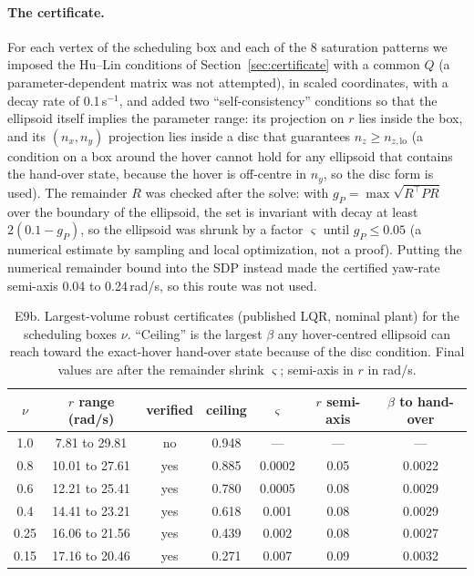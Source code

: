 \paragraph{The certificate.} For each vertex of the scheduling box and each of the 8 saturation patterns we imposed the Hu--Lin conditions of Section~\ref{sec:certificate} with a common $Q$ (a parameter-dependent matrix was not attempted), in scaled coordinates, with a decay rate of 0.1\,s$^{-1}$, and added two ``self-consistency'' conditions so that the ellipsoid itself implies the parameter range: its projection on $r$ lies inside the box, and its $(n_x,n_y)$ projection lies inside a disc that guarantees $n_z\ge n_{z,\mathrm{lo}}$ (a condition on a box around the hover cannot hold for any ellipsoid that contains the hand-over state, because the hover is off-centre in $n_y$, so the disc form is used). The remainder $R$ was checked after the solve: with $g_P=\max\sqrt{R^\top P R}$ over the boundary of the ellipsoid, the set is invariant with decay at least $2(0.1-g_P)$, so the ellipsoid was shrunk by a factor $\varsigma$ until $g_P\le0.05$ (a numerical estimate by sampling and local optimization, not a proof). Putting the numerical remainder bound into the SDP instead made the certified yaw-rate semi-axis 0.04 to 0.24\,rad/s, so this route was not used.

\begin{table}[h]
\centering\small
\caption{E9b. Largest-volume robust certificates (published LQR, nominal plant) for the scheduling boxes $\nu$. ``Ceiling'' is the largest $\beta$ any hover-centred ellipsoid can reach toward the exact-hover hand-over state because of the disc condition. Final values are after the remainder shrink $\varsigma$; semi-axis in $r$ in rad/s.}\label{tab:e9b}
\begin{tabular}{ccccccc}
\toprule
$\nu$ & $r$ range (rad/s) & verified & ceiling & $\varsigma$ & $r$ semi-axis & $\beta$ to hand-over \\
\midrule
1.0  & 7.81 to 29.81 & no & 0.948 & --- & --- & --- \\
0.8  & 10.01 to 27.61 & yes & 0.885 & 0.0002 & 0.05 & 0.0022 \\
0.6  & 12.21 to 25.41 & yes & 0.780 & 0.0005 & 0.08 & 0.0029 \\
0.4  & 14.41 to 23.21 & yes & 0.618 & 0.001 & 0.08 & 0.0029 \\
0.25 & 16.06 to 21.56 & yes & 0.439 & 0.002 & 0.08 & 0.0027 \\
0.15 & 17.16 to 20.46 & yes & 0.271 & 0.007 & 0.09 & 0.0032 \\
\bottomrule
\end{tabular}
\end{table}

